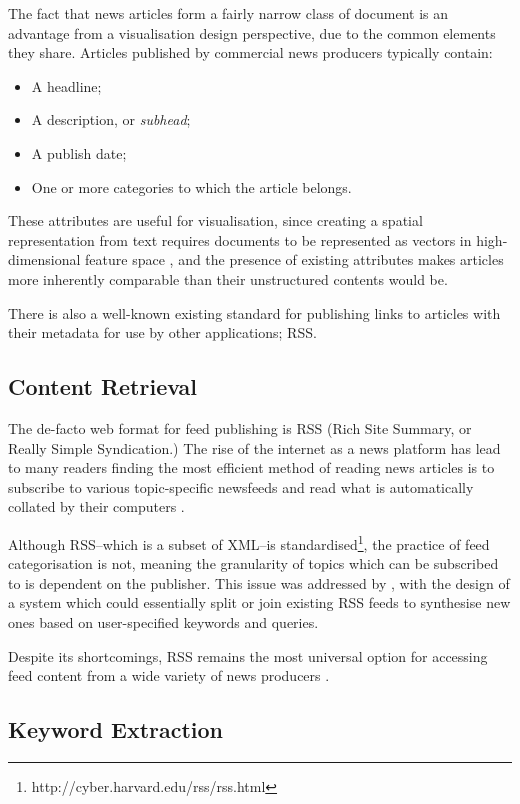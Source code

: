 The fact that news articles form a fairly narrow class of document is an advantage from a visualisation design perspective, due to the common elements they share. Articles published by commercial news producers typically contain:
\begin{itemize}[noitemsep]
	\item A headline;
	\item A description, or \textit{subhead};
	\item A publish date;
	\item One or more categories to which the article belongs.
\end{itemize}
These attributes are useful for visualisation, since creating a spatial representation from text requires documents to be represented as vectors in high-dimensional feature space \citep{VisualizingTheNonVisual}, and the presence of existing attributes makes articles more inherently comparable than their unstructured contents would be.

There is also a well-known existing standard for publishing links to articles with their metadata for use by other applications; RSS.

\subsection{Content Retrieval}
The de-facto web format for feed publishing is RSS (Rich Site Summary, or Really Simple Syndication.) The rise of the internet as a news platform has lead to many readers finding the most efficient method of reading news articles is to subscribe to various topic-specific newsfeeds and read what is automatically collated by their computers \citep{Nreader}.

Although RSS--which is a subset of XML--is standardised\footnote{http://cyber.harvard.edu/rss/rss.html}, the practice of feed categorisation is not, meaning the granularity of topics which can be subscribed to is dependent on the publisher. This issue was addressed by \citet{PersonalNewsRss}, with the design of a system which could essentially split or join existing RSS feeds to synthesise new ones based on user-specified keywords and queries.

Despite its shortcomings, RSS remains the most universal option for accessing feed content from a wide variety of news producers 
\citep{MiningAndVisualisingInformationFromRSSFeeds}.

\subsection{Keyword Extraction}

